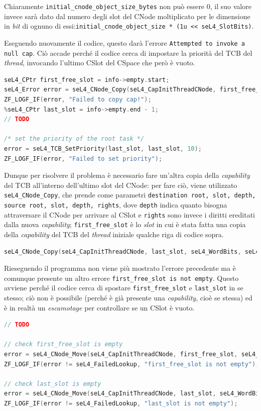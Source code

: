 Chiaramente \texttt{initial\_cnode\_object\_size\_bytes} non può essere 0, il suo valore invece sarà dato dal numero degli slot del CNode moltiplicato per le dimensione in \textit{bit} di ognuno di essi:\texttt{initial\_cnode\_object\_size * (1u << seL4\_SlotBits)}.

Eseguendo nuovamente il codice, questo darà l'errore \texttt{Attempted to invoke a null cap}. Ciò accade perché il codice cerca di impostare la priorità del TCB del \textit{thread}, invocando l'ultimo CSlot del CSpace che però è vuoto.
\begin{lstlisting}[language=C++]
seL4_CPtr first_free_slot = info->empty.start;
seL4_Error error = seL4_CNode_Copy(seL4_CapInitThreadCNode, first_free_slot, seL4_WordBits, seL4_CapInitThreadCNode, seL4_CapInitThreadTCB, seL4_WordBits, seL4_AllRights);
ZF_LOGF_IF(error, "Failed to copy cap!");
%seL4_CPtr last_slot = info->empty.end - 1;
// TODO

/* set the priority of the root task */
error = seL4_TCB_SetPriority(last_slot, last_slot, 10);
ZF_LOGF_IF(error, "Failed to set priority");
\end{lstlisting}

Dunque per risolvere il problema è necessario fare un'altra copia della \textit{capability} del TCB all'interno dell'ultimo slot del CNode: per fare ciò, viene utilizzato \texttt{seL4\_CNode\_Copy}, che prende come parametri \texttt{destination root, slot, depth, source root, slot, depth, rights}, dove \texttt{depth} indica quanto bisogna attraversare il CNode per arrivare al CSlot e \texttt{rights} sono invece i diritti ereditati dalla nuova \textit{capability}; \texttt{first\_free\_slot} è lo \textit{slot} in cui è stata fatta una copia della \textit{capability} del TCB del \textit{thread} iniziale qualche riga di codice sopra.
\begin{lstlisting}[language=C++]
seL4_CNode_Copy(seL4_CapInitThreadCNode, last_slot, seL4_WordBits, seL4_CapInitThreadCNode, first_free_slot, seL4_WordBits, seL4_AllRights);
\end{lstlisting}

Rieseguendo il programma non viene più mostrato l'errore precedente ma è comunque presente un altro errore \texttt{first\_free\_slot is not empty}. Questo avviene perché il codice cerca di spostare \texttt{first\_free\_slot} e \texttt{last\_slot} in se stesso; ciò non è possibile (perché è già presente una \textit{capability}, cioè se stessa) ed è in realtà un \textit{escamotage} per controllare se un CSlot è vuoto.
\begin{lstlisting}[language=C++]
// TODO 
         
// check first_free_slot is empty
error = seL4_CNode_Move(seL4_CapInitThreadCNode, first_free_slot, seL4_WordBits, seL4_CapInitThreadCNode, first_free_slot, seL4_WordBits);
ZF_LOGF_IF(error != seL4_FailedLookup, "first_free_slot is not empty");

// check last_slot is empty
error = seL4_CNode_Move(seL4_CapInitThreadCNode, last_slot, seL4_WordBits, seL4_CapInitThreadCNode, last_slot, seL4_WordBits);
ZF_LOGF_IF(error != seL4_FailedLookup, "last_slot is not empty");
\end{lstlisting}

